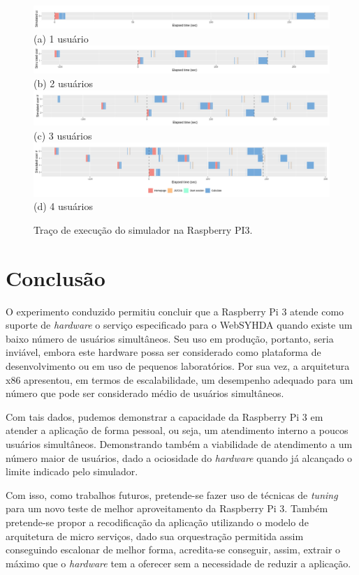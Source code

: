 \documentclass[12pt,english,brazil]{article}
\begin{document}
\begin{figure}[htbp]
  \centering 
  \includegraphics[scale=.4]{paperWSCAD2021/figures/user_PI3_1_worker_edit.jpg}\\(a) 1 usuário
 \includegraphics[scale=.4]{paperWSCAD2021/figures/user_PI3_2_worker_edit.jpg}\\(b) 2 usuários
 \includegraphics[scale=.4]{paperWSCAD2021/figures/user_PI3_3_worker_edit.jpg}\\(c) 3 usuários
 \includegraphics[scale=.4]{paperWSCAD2021/figures/user_PI3_4_worker.png}\\(d) 4 usuários
\caption{Traço de execução do simulador na Raspberry PI3.}
  \label{fig:PI3}
\end{figure}

\section{Conclusão} \label{sec:conlusao}
O experimento conduzido permitiu concluir que a Raspberry Pi 3 atende como suporte de \emph{hardware} o serviço especificado para o WebSYHDA quando existe um baixo número de usuários simultâneos. Seu uso em produção, portanto, seria inviável, embora este hardware possa ser considerado como plataforma de desenvolvimento ou em uso de pequenos laboratórios.  Por sua vez, a arquitetura x86 apresentou, em termos de escalabilidade, um desempenho adequado para um número que pode ser considerado médio de usuários simultâneos. 

Com tais dados, pudemos demonstrar a capacidade da Raspberry Pi 3 em atender a aplicação de forma pessoal, ou seja, um atendimento interno a poucos usuários simultâneos. Demonstrando também a viabilidade de atendimento a um número maior de usuários, dado a ociosidade do \emph{hardware} quando já alcançado o limite indicado pelo simulador.

Com isso, como trabalhos futuros, pretende-se fazer uso de técnicas de \emph{tuning} para um novo teste de melhor aproveitamento da Raspberry Pi 3. Também pretende-se propor a recodificação da aplicação utilizando o modelo de arquitetura de micro serviços, dado sua orquestração permitida assim conseguindo escalonar de melhor forma, acredita-se conseguir, assim, extrair o máximo que o \emph{hardware} tem a oferecer sem a necessidade de reduzir a aplicação. 




\label{fimdotexto}
\end{document}
